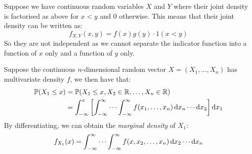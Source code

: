 \documentclass[../main.tex]{subfiles}
\begin{document}
\begin{remark}[Warning]
  Suppose we have continuous random variables $X$ and $Y$ where their joint density is factorised as above for $x < y$ and 0 otherwise.
  This means that their joint density can be written as:
  \[
    f_{X, Y}(x, y) = f(x)g(y) \cdot 1(x < y)
  \]
  So they are not independent as we cannot separate the indicator function into a function of $x$ only and a function of $y$ only.
\end{remark}
\begin{definition}
  Suppose the continuous $n$-dimensional random vector $X = (X_1, \ldots, X_n)$ has multivariate density $f$, we then have that:
  \label{marginalContinuous}
  \begin{align*}
    \P(X_1 \leq x) &= \P(X_1 \leq x, X_2 \in \R, \ldots, X_n \in \R) \\
                   &= \int_{-\infty}^{x} \left[\int_{-\infty}^{\infty} \cdots \int_{-\infty}^{\infty} f(x_1, \ldots, x_n) \d{x_n} \cdots \d{x_2}\right] \d{x_1}
  \end{align*}
  By differentiating, we can obtain the \textit{marginal density} of $X_1$:
  \[
    f_{X_1}(x) = \int_{-\infty}^{\infty} \cdots \int_{-\infty}^{\infty} f(x, x_2, \ldots, x_n) \d{x_2} \cdots \d{x_n}
  \]
\end{definition}
\end{document}
